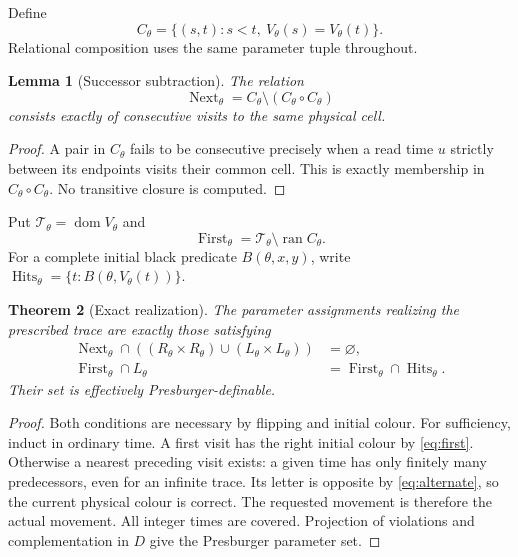 \documentclass[11pt]{article}
\newtheorem{theorem}{Theorem}[section]
\newtheorem{lemma}[theorem]{Lemma}
\theoremstyle{remark}\newtheorem{remark}[theorem]{Remark}
\newcommand{\dom}{\operatorname{dom}}\newcommand{\ran}{\operatorname{ran}}
\begin{document}
Define
\[
 C_\theta=\{(s,t):s<t,\ V_\theta(s)=V_\theta(t)\}.
\]
Relational composition uses the same parameter tuple throughout.
\begin{lemma}[Successor subtraction]\label{lem:next}
The relation
\begin{equation}\label{eq:next}
 \operatorname{Next}_\theta=C_\theta\setminus(C_\theta\circ C_\theta)
\end{equation}
consists exactly of consecutive visits to the same physical cell.
\end{lemma}
\begin{proof}
A pair in $C_\theta$ fails to be consecutive precisely when a read time $u$
strictly between its endpoints visits their common cell. This is exactly
membership in $C_\theta\circ C_\theta$. No transitive closure is computed.
\end{proof}

Put $\mathcal T_\theta=\dom V_\theta$ and
\[
 \operatorname{First}_\theta=\mathcal T_\theta\setminus\ran C_\theta.
\]
For a complete initial black predicate $B(\theta,x,y)$, write
$\operatorname{Hits}_\theta=\{t:B(\theta,V_\theta(t))\}$.

\begin{theorem}[Exact realization]\label{thm:semantics}
The parameter assignments realizing the prescribed trace are exactly those
satisfying
\begin{align}
\operatorname{Next}_\theta\cap
 ((R_\theta\times R_\theta)\cup(L_\theta\times L_\theta))&=\varnothing,
                                                        \label{eq:alternate}\\
\operatorname{First}_\theta\cap L_\theta
 &=\operatorname{First}_\theta\cap\operatorname{Hits}_\theta.
                                                        \label{eq:first}
\end{align}
Their set is effectively Presburger-definable.
\end{theorem}
\begin{proof}
Both conditions are necessary by flipping and initial colour. For sufficiency,
induct in ordinary time. A first visit has the right initial colour by
\eqref{eq:first}. Otherwise a nearest preceding visit exists: a given time has
only finitely many predecessors, even for an infinite trace. Its letter is
opposite by \eqref{eq:alternate}, so the current physical colour is correct.
The requested movement is therefore the actual movement. All integer times
are covered. Projection of violations and complementation in $D$ give the
Presburger parameter set.
\end{proof}
\end{document}
